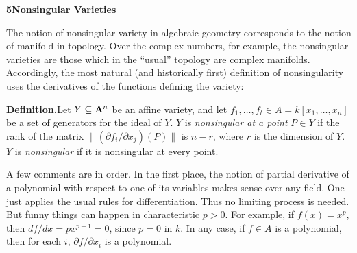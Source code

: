 {\medskip\noindent\hypertarget{sec-I-5}{}\large\textbf{5\quad Nonsingular Varieties}\normalsize\par\smallskip
The notion of nonsingular variety in algebraic geometry corresponds to the notion of manifold in topology. Over the complex numbers, for example, the nonsingular varieties are those which in the \textquotedblleft{}usual\textquotedblright{} topology are complex manifolds. Accordingly, the most natural (and historically first) definition of nonsingularity uses the derivatives of the functions defining the variety:

\smallskip\noindent\textbf{Definition.}\enspace Let $Y\subseteq\AffSpace{n}$ be an affine variety, and let $f_1,\ldots,f_t\in A=k[x_1,\ldots,x_n]$ be a set of generators for the ideal of $Y$. $Y$ is \emph{nonsingular at a point} $P\in Y$ if the rank of the matrix $\lVert(\partial f_i/\partial x_j)(P)\rVert$ is $n-r$, where $r$ is the dimension of $Y$. $Y$ is \emph{nonsingular} if it is nonsingular at every point.

A few comments are in order. In the first place, the notion of partial derivative of a polynomial with respect to one of its variables makes sense over any field. One just applies the usual rules for differentiation. Thus no limiting process is needed. But funny things can happen in characteristic $p>0$. For example, if $f(x)=x^p$, then $df/dx=px^{p-1}=0$, since $p=0$ in $k$. In any case, if $f\in A$ is a polynomial, then for each $i$, $\partial f/\partial x_i$ is a polynomial.}

